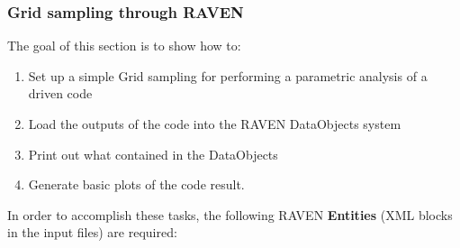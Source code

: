 \subsubsection{Grid sampling through RAVEN}
\label{subsub:Gridexample}
The goal of this section is to show how to:
 \begin{enumerate}
   \item Set up a simple Grid sampling for performing a parametric analysis of a driven code
   \item Load the outputs of the code into the RAVEN DataObjects system
   \item Print out what contained in the DataObjects
   \item Generate basic plots of the code result.
\end{enumerate}
In order to accomplish these tasks, the following RAVEN \textbf{Entities} (XML blocks in the input files) are required:

